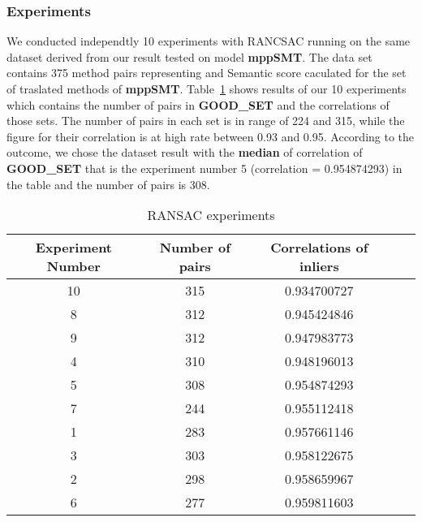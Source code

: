 





\subsubsection{Experiments}
We conducted independtly 10 experiments with RANCSAC running on the same dataset derived from our result tested on model \textbf{mppSMT}. The data set contains 375 method pairs representing {\model} and Semantic score caculated for the set of traslated methods of \textbf{mppSMT}. Table~\ref{table:RANSAC_experiments} shows results of our 10 experiments which contains the number of pairs in \textbf{GOOD\_SET} and the correlations of those sets. The number of pairs in each set is in range of 224 and 315, while the figure for their correlation is at high rate between 0.93 and 0.95. 
According to the outcome, we chose the dataset result with the \textbf{median} of correlation of \textbf{GOOD\_SET} that is the experiment number 5 (correlation = 0.954874293) in the table and the number of pairs is 308.


\begin{table}
	\caption{RANSAC experiments}
	\begin{tabular}{|c|c|c|c|c|}
		\hline
		Experiment Number & Number of pairs & Correlations of inliers \\
		\hline
		10	& 315	& 0.934700727 \\		
		8	& 312	& 0.945424846 \\	
		9	& 312	& 0.947983773 \\
		4	& 310	& 0.948196013 \\
		{\cellcolor[gray]{.8}}5	& {\cellcolor[gray]{.8}}308	& {\cellcolor[gray]{.8}}0.954874293 \\
		7	& 244	& 0.955112418 \\	
		1	& 283	& 0.957661146 \\
		3	& 303	& 0.958122675 \\
		2	& 298	& 0.958659967 \\
		6	& 277	& 0.959811603 \\		
		\hline
	\end{tabular}
	\label{table:RANSAC_experiments}
\end{table}

